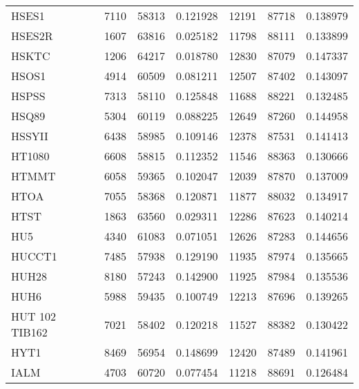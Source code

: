 \begin{tabular}{lrrrrrr}
                                HSES1 &      7110 &    58313 &  0.121928 &     12191 &    87718 &  0.138979 \\
                               HSES2R &      1607 &    63816 &  0.025182 &     11798 &    88111 &  0.133899 \\
                                HSKTC &      1206 &    64217 &  0.018780 &     12830 &    87079 &  0.147337 \\
                                HSOS1 &      4914 &    60509 &  0.081211 &     12507 &    87402 &  0.143097 \\
                                HSPSS &      7313 &    58110 &  0.125848 &     11688 &    88221 &  0.132485 \\
                                HSQ89 &      5304 &    60119 &  0.088225 &     12649 &    87260 &  0.144958 \\
                               HSSYII &      6438 &    58985 &  0.109146 &     12378 &    87531 &  0.141413 \\
                               HT1080 &      6608 &    58815 &  0.112352 &     11546 &    88363 &  0.130666 \\
                                HTMMT &      6058 &    59365 &  0.102047 &     12039 &    87870 &  0.137009 \\
                                 HTOA &      7055 &    58368 &  0.120871 &     11877 &    88032 &  0.134917 \\
                                 HTST &      1863 &    63560 &  0.029311 &     12286 &    87623 &  0.140214 \\
                                  HU5 &      4340 &    61083 &  0.071051 &     12626 &    87283 &  0.144656 \\
                               HUCCT1 &      7485 &    57938 &  0.129190 &     11935 &    87974 &  0.135665 \\
                                HUH28 &      8180 &    57243 &  0.142900 &     11925 &    87984 &  0.135536 \\
                                 HUH6 &      5988 &    59435 &  0.100749 &     12213 &    87696 &  0.139265 \\
                       HUT 102 TIB162 &      7021 &    58402 &  0.120218 &     11527 &    88382 &  0.130422 \\
                                 HYT1 &      8469 &    56954 &  0.148699 &     12420 &    87489 &  0.141961 \\
                                 IALM &      4703 &    60720 &  0.077454 &     11218 &    88691 &  0.126484 \\

\end{tabular}
